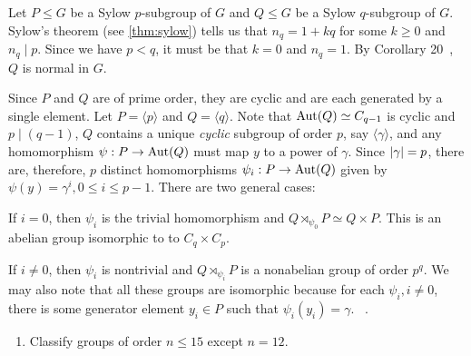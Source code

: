Let $P \le G$ be a Sylow $p$-subgroup of $G$
and $Q \le G$ be a Sylow $q$-subgroup of $G$.
Sylow's theorem (see \ref{thm:sylow}) tells us that
$n_q = 1 + kq$ for some $k \ge 0$ and $n_q \mid p$.
Since we have $p < q$, it must be that $k = 0$ and $n_q = 1$.
By Corollary 20~\cite[p. 142]{DummitFoote}, $Q$ is normal in $G$.


Since $P$ and $Q$ are of prime order, they are cyclic and are each generated by a single element.
Let $P = \langle p \rangle$ and $Q = \langle q \rangle$.
Note that $\operatorname{Aut}(Q) \simeq C_{q-1}$ is cyclic and $p \mid (q-1)$,
$Q$ contains a unique \emph{cyclic} subgroup of order $p$, say $\langle \gamma \rangle$,
and any homomorphism $\psi : P \to \operatorname{Aut}(Q)$ must map $y$ to a power of $\gamma$.
Since $\lvert\gamma\rvert = p$, there are, therefore, $p$ distinct homomorphisms
$\psi_i : P \to \operatorname{Aut}(Q)$ given by $\psi(y) = \gamma^i, 0 \le i \le p-1$.
There are two general cases:
\begin{enumalph}
  \item If $i = 0$, then $\psi_i$ is the trivial homomorphism
    and $Q \rtimes_{\psi_0} P \simeq Q \times P$. This is an abelian
    group isomorphic to to $C_q \times C_p$.
  \item If $i \ne 0$, then $\psi_i$ is nontrivial and $Q \rtimes_{\psi_i} P$
    is a nonabelian group of order $p^q$. We may also note that all these groups
    are isomorphic because for each $\psi_i, i \ne 0$, there is some generator
    element $y_i \in P$ such that $\psi_i(y_i) = \gamma$.~\cite[p. 181]{DummitFoote}
    .~\label{pro:nonabelian}
\end{enumalph}

\begin{Answer}
  \begin{enumerate}
  \item Classify groups of order $n \leq 15$ except $n=12$.
  \end{enumerate}
\end{Answer}
